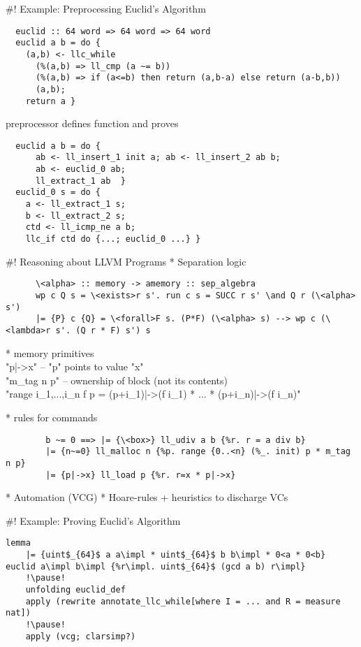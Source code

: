 \documentclass[fleqn]{beamer}
\begin{document}
#! Example: Preprocessing Euclid's Algorithm
  \small
  \begin{lstlisting}
  euclid :: 64 word => 64 word => 64 word
  euclid a b = do {
    (a,b) <- llc_while
      (%(a,b) => ll_cmp (a ~= b))
      (%(a,b) => if (a<=b) then return (a,b-a) else return (a-b,b))
      (a,b);
    return a }
  \end{lstlisting}
  \pause
  preprocessor defines function  and proves
  \begin{lstlisting}
  euclid a b = do {
      ab <- ll_insert_1 init a; ab <- ll_insert_2 ab b;
      ab <- euclid_0 ab;
      ll_extract_1 ab  }
  euclid_0 s = do {
    a <- ll_extract_1 s;
    b <- ll_extract_2 s;
    ctd <- ll_icmp_ne a b;
    llc_if ctd do {...; euclid_0 ...} }
  \end{lstlisting}

#! Reasoning about LLVM Programs
  * Separation logic
    \begin{lstlisting}
      \<alpha> :: memory -> amemory :: sep_algebra
      wp c Q s = \<exists>r s'. run c s = SUCC r s' \and Q r (\<alpha> s')
      |= {P} c {Q} = \<forall>F s. (P*F) (\<alpha> s) --> wp c (\<lambda>r s'. (Q r * F) s') s
    \end{lstlisting}

    \pause
    * memory primitives\\
      \is"p|->x" -- \is"p" points to value \is"x"\\
      \is"m_tag n p" -- ownership of block (not its contents)\\
      \is"range {i_1,...,i_n} f p = (p+i_1)|->(f i_1) * ... * (p+i_n)|->(f i_n)"

    \pause
    * rules for commands
      \begin{lstlisting}
        b ~= 0 ==> |= {\<box>} ll_udiv a b {%r. r = a div b}
        |= {n~=0} ll_malloc n {%p. range {0..<n} (%_. init) p * m_tag n p}
        |= {p|->x} ll_load p {%r. r=x * p|->x}
      \end{lstlisting}

  \pause
  * Automation (VCG)
    * Hoare-rules + heuristics to discharge VCs

#! Example: Proving Euclid's Algorithm
  \small
  \begin{lstlisting}[escapechar=!]
    lemma
    |= {uint$_{64}$ a a\impl * uint$_{64}$ b b\impl * 0<a * 0<b} euclid a\impl b\impl {%r\impl. uint$_{64}$ (gcd a b) r\impl}
    !\pause!
    unfolding euclid_def
    apply (rewrite annotate_llc_while[where I = ... and R = measure nat])
    !\pause!
    apply (vcg; clarsimp?)
  \end{lstlisting}
  \pause
\end{document}
